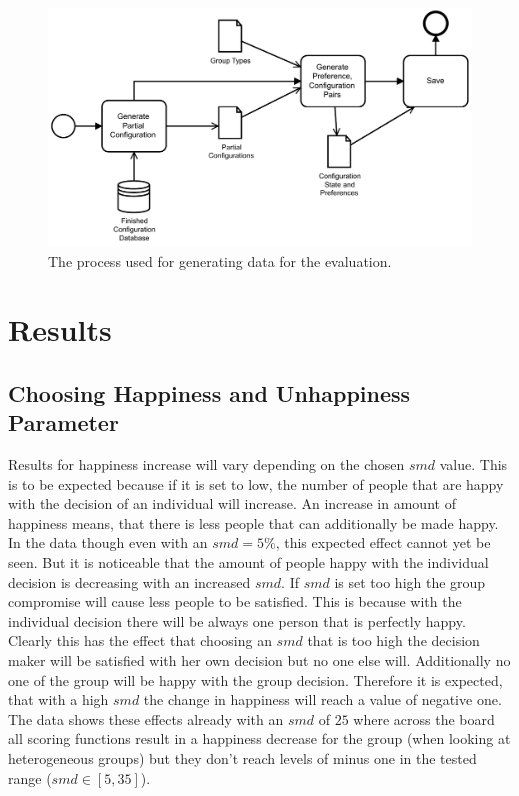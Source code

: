 \begin{figure}
    \centering
    \includegraphics[width=1\textwidth]{./figures/60_evaluation/bpmn_evaluation_input_data_generation.pdf}
    \caption{The process used for generating data for the evaluation.}
    \label{fig:Evaluation:GeneratingDataProcess}
\end{figure}

\section{Results}
\label{fig:Evaluation:Results}

\subsection{Choosing Happiness and Unhappiness Parameter}

Results for happiness increase will vary depending on the chosen $smd$ value. This is to be expected because if it is set to low, the number of people that are happy with the decision of an individual will increase. An increase in amount of happiness means, that there is less people that can additionally be made happy. In the data though even with an $smd = 5\%$, this expected effect cannot yet be seen. But it is noticeable that the amount of people happy with the individual decision is decreasing with an increased $smd$. If $smd$ is set too high the group compromise will cause less people to be satisfied. This is because with the individual decision there will be always one person that is perfectly happy. Clearly this has the effect that choosing an $smd$ that is too high the decision maker will be satisfied with her own decision but no one else will. Additionally no one of the group will be happy with the group decision. Therefore it is expected, that with a high $smd$ the change in happiness will reach a value of negative one. The data shows these effects already with an $smd$ of $25$ where across the board all scoring functions result in a happiness decrease for the group (when looking at heterogeneous groups) but they don't reach levels of minus one in the tested range ($smd \in [5,35]$).

